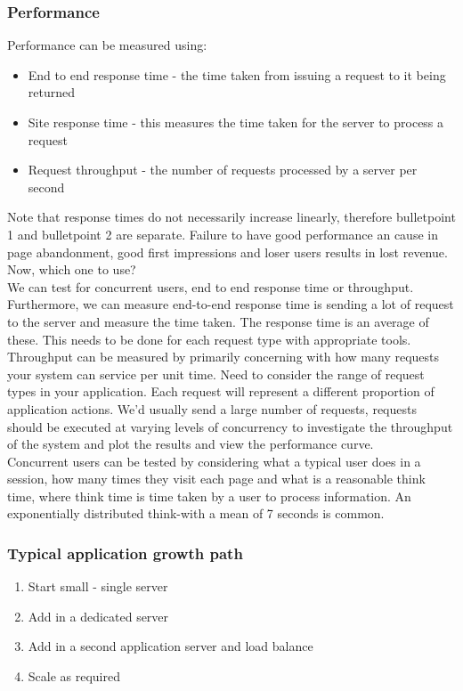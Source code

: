\documentclass[a4paper]{article}
\theoremstyle{plain}
\theoremstyle{definition}
\theoremstyle{remark}
\begin{document}
\begin{flushleft}
\subsubsection{Performance}
Performance can be measured using:
\begin{itemize}
	\item End to end response time - the time taken from issuing a request to it being returned
	\item Site response time - this measures the time taken for the server to process a request
	\item Request throughput - the number of requests processed by a server per second
\end{itemize}
Note that response times do not necessarily increase linearly, therefore bulletpoint 1 and bulletpoint 2 are separate. Failure to have good performance an cause in page abandonment, good first impressions and loser users results in lost revenue. Now, which one to use? \\
We can test for concurrent users, end to end response time or throughput. Furthermore, we can measure end-to-end response time is sending a lot of request to the server and measure the time taken. The response time is an average of these. This needs to be done for each request type with appropriate tools. \\ 
Throughput can be measured by primarily concerning with how many requests your system can service per unit time. Need to consider the range of request types in your application. Each request will represent a different proportion of application actions. We'd usually send a large number of requests, requests should be executed at varying levels of concurrency to investigate the throughput of the system and plot the results and view the performance curve. \\
Concurrent users can be tested by considering what a typical user does in a session, how many times they visit each page and what is a reasonable think time, where think time is time taken by a user to process information. An exponentially distributed think-with a mean of 7 seconds is common. 
\subsubsection{Typical application growth path}
\begin{enumerate}
	\item Start small - single server
	\item Add in a dedicated server
	\item Add in a second application server and load balance
	\item Scale as required
\end{enumerate}

\end{flushleft}
\end{document}
